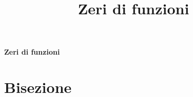 \documentclass{report}
\title{Zeri di funzioni}
\date{}
\begin{document}
\Huge{\textbf{Zeri di funzioni}}
\section*{Bisezione}

\end{document}
